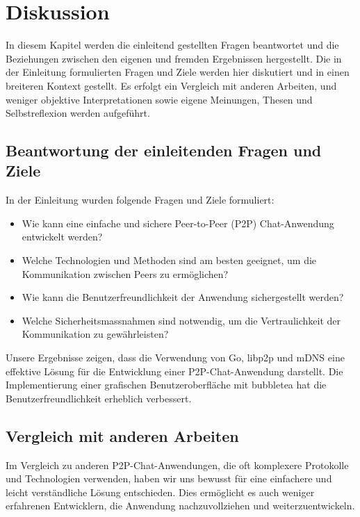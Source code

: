 \section{Diskussion}

In diesem Kapitel werden die einleitend gestellten Fragen beantwortet und die Beziehungen zwischen den eigenen und fremden Ergebnissen hergestellt. Die in der Einleitung formulierten Fragen und Ziele werden hier diskutiert und in einen breiteren Kontext gestellt. Es erfolgt ein Vergleich mit anderen Arbeiten, und weniger objektive Interpretationen sowie eigene Meinungen, Thesen und Selbstreflexion werden aufgeführt.

\subsection{Beantwortung der einleitenden Fragen und Ziele}

In der Einleitung wurden folgende Fragen und Ziele formuliert:
\begin{itemize}
    \item Wie kann eine einfache und sichere Peer-to-Peer (P2P) Chat-Anwendung entwickelt werden?
    \item Welche Technologien und Methoden sind am besten geeignet, um die Kommunikation zwischen Peers zu ermöglichen?
    \item Wie kann die Benutzerfreundlichkeit der Anwendung sichergestellt werden?
    \item Welche Sicherheitsmassnahmen sind notwendig, um die Vertraulichkeit der Kommunikation zu gewährleisten?
\end{itemize}

Unsere Ergebnisse zeigen, dass die Verwendung von Go, libp2p und mDNS eine effektive Lösung für die Entwicklung einer P2P-Chat-Anwendung darstellt. Die Implementierung einer grafischen Benutzeroberfläche mit bubbletea hat die Benutzerfreundlichkeit erheblich verbessert.

\subsection{Vergleich mit anderen Arbeiten}

Im Vergleich zu anderen P2P-Chat-Anwendungen, die oft komplexere Protokolle und Technologien verwenden, haben wir uns bewusst für eine einfachere und leicht verständliche Lösung entschieden. Dies ermöglicht es auch weniger erfahrenen Entwicklern, die Anwendung nachzuvollziehen und weiterzuentwickeln.

